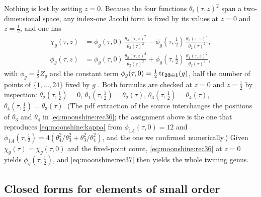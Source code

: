 Nothing is lost by setting $z=0$. Because the four functions $\theta_i(\tau,z)^2$ span a
two-dimensional space, any index-one Jacobi form is fixed by its values at $z=0$ and
$z=\tfrac12$, and one has 
\begin{align}
  \chi_g(\tau,z)&=\phi_g(\tau,0)\,\frac{\theta_4(\tau,z)^2}{\theta_2(\tau)^2}
    -\phi_g(\tau,\tfrac12)\,\frac{\theta_3(\tau,z)^2}{\theta_2(\tau)^2},
    \label{eq:moonshine:rec36}\\
  \phi_g(\tau,z)&=\phi_g(\tau,0)\,\frac{\theta_2(\tau,z)^2}{\theta_2(\tau)^2}
    +\phi_g(\tau,\tfrac12)\,\frac{\theta_1(\tau,z)^2}{\theta_2(\tau)^2},
    \label{eq:moonshine:rec37}
\end{align}
with $\phi_g=\tfrac12Z_g$ and the constant term
$\phi_g(\tau,0)=\tfrac12\operatorname{tr}_{\mathbf{23}\oplus\mathbf1}(g)$, half the number of points
of $\{1,\dots,24\}$ fixed by $g$ . Both formulas are
checked at $z=0$ and $z=\tfrac12$ by inspection: $\theta_2(\tau,\tfrac12)=0$,
$\theta_1(\tau,\tfrac12)=\theta_2(\tau)$, $\theta_3(\tau,\tfrac12)=\theta_4(\tau)$,
$\theta_4(\tau,\tfrac12)=\theta_3(\tau)$. (The pdf extraction of the source interchanges
the positions of $\theta_3$ and $\theta_4$ in \eqref{eq:moonshine:rec36}; the assignment
above is the one that reproduces \eqref{eq:moonshine:kappa} from
$\phi_{1A}(\tau,0)=12$ and $\phi_{1A}(\tau,\tfrac12)=4(\theta_4^2/\theta_3^2+
\theta_3^2/\theta_4^2)$, and the one we confirmed numerically.) Given
$\chi_g(\tau)=\chi_g(\tau,0)$ and the fixed-point count, \eqref{eq:moonshine:rec36} at
$z=0$ yields $\phi_g(\tau,\tfrac12)$, and \eqref{eq:moonshine:rec37} then yields the whole
twining genus.

\subsection{Closed forms for elements of small order}


